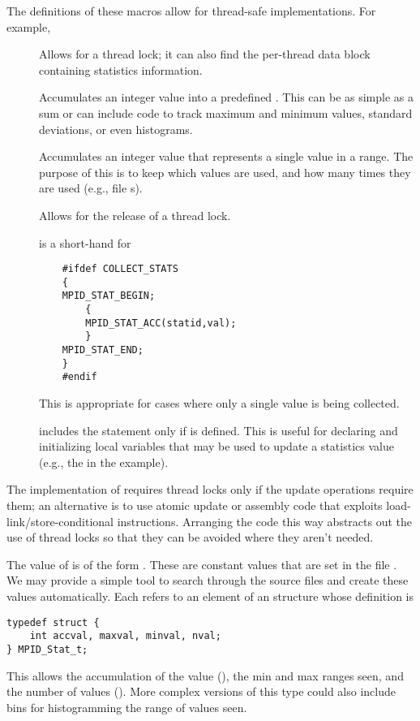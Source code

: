 \documentclass{article}
\begin{document}
The definitions of these macros allow for thread-safe
implementations.  For example,
\begin{description}
\item[]Allows for a thread lock; it can also find the 
per-thread data block containing statistics information. 
\item[]Accumulates an integer value into a predefined
.  This can be as simple as a sum or can include code to
track maximum and minimum values, standard deviations, or even
histograms. 
\item[]Accumulates an integer value that
represents a single value in a range.  The purpose of this is to keep
which values are used, and how many times they are used (e.g.,
file s).
\item[]Allows for the release of a thread lock.
\item[]is a short-hand for 
\begin{verbatim}
    #ifdef COLLECT_STATS
    {
    MPID_STAT_BEGIN;
        {
        MPID_STAT_ACC(statid,val);
        }
    MPID_STAT_END;
    }
    #endif
\end{verbatim}
This is appropriate for cases where only a single value is being
collected.
\item[]includes the statement only if
 is defined.  This is useful for declaring and
initializing local variables that may be used to update a statistics
value (e.g., the  in the example).
\end{description}

The implementation of  requires thread locks
only if the update operations require 
them; an alternative is to use atomic update or assembly code that
exploits load-link/store-conditional instructions.  Arranging the code
this way abstracts out the use of thread locks so that they can be
avoided where they aren't needed.

The value of  is of the form .  These are
constant values that are set in the file .  We may provide a
simple tool to search through the source files and create these values
automatically.  Each  refers to an element of an
 structure whose definition is
\begin{verbatim}
typedef struct {
    int accval, maxval, minval, nval;
} MPID_Stat_t;
\end{verbatim}
This allows the accumulation of the value (), the min and max
ranges seen, and the number of values ().  More complex versions of
this type could also include bins for histogramming the range of values seen.
\end{document}
